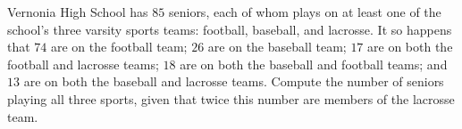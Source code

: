 Vernonia High School has $85$ seniors, each of whom plays on at least one of the school's three varsity sports teams: football, baseball, and lacrosse. It so happens that $74$ are on the football team; $26$ are on the baseball team; $17$ are on both the football and lacrosse teams; $18$ are on both the baseball and football teams; and $13$ are on both the baseball and lacrosse teams. Compute the number of seniors playing all three sports, given that twice this number are members of the lacrosse team.